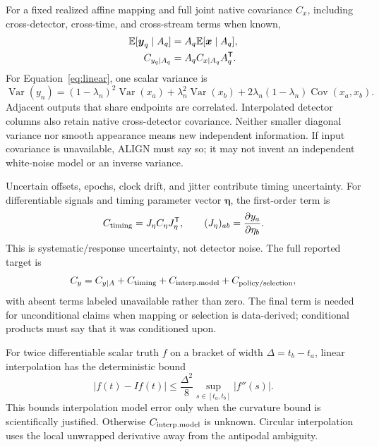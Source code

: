 \documentclass[11pt]{article}
\newcommand{\E}{\mathbb{E}}
\newcommand{\Cov}{\operatorname{Cov}}
\newcommand{\Var}{\operatorname{Var}}
\begin{document}
For a fixed realized affine mapping and full joint native covariance \(C_x\),
including cross-detector, cross-time, and cross-stream terms when known,
\begin{align}
 \E[\boldsymbol y_q\mid A_q]&=A_q\E[\boldsymbol x\mid A_q],\notag\\
 C_{y_q\mid A_q}&=A_qC_{x\mid A_q}A_q^{\mathsf T}.
 \label{eq:covariance}
\end{align}
For Equation~\eqref{eq:linear}, one scalar variance is
\begin{equation}
 \Var(y_n)=(1-\lambda_n)^2\Var(x_a)+\lambda_n^2\Var(x_b)
 +2\lambda_n(1-\lambda_n)\Cov(x_a,x_b).
 \label{eq:linear-variance}
\end{equation}
Adjacent outputs that share endpoints are correlated.  Interpolated detector
columns also retain native cross-detector covariance.  Neither smaller
diagonal variance nor smooth appearance means new independent information.
If input covariance is unavailable, ALIGN must say so; it may not invent an
independent white-noise model or an inverse variance.

Uncertain offsets, epochs, clock drift, and jitter contribute timing
uncertainty.  For differentiable signals and timing parameter vector
\(\boldsymbol\eta\), the first-order term is
\begin{equation}
 C_{\rm timing}=J_{\eta}C_{\eta}J_{\eta}^{\mathsf T},
 \qquad (J_{\eta})_{ab}=\frac{\partial y_a}{\partial\eta_b}.
 \label{eq:timing-covariance}
\end{equation}
This is systematic/response uncertainty, not detector noise.  The full
reported target is
\begin{equation}
 C_y=C_{y\mid A}+C_{\rm timing}+C_{\rm interp.model}
 +C_{\rm policy/selection},
 \label{eq:full-uncertainty}
\end{equation}
with absent terms labeled unavailable rather than zero.  The final term is
needed for unconditional claims when mapping or selection is data-derived;
conditional products must say that it was conditioned upon.

For twice differentiable scalar truth \(f\) on a bracket of width
\(\Delta=t_b-t_a\), linear interpolation has the deterministic bound
\begin{equation}
 |f(t)-I f(t)|\leq\frac{\Delta^2}{8}
 \sup_{s\in[t_a,t_b]}|f''(s)|.
 \label{eq:interp-bound}
\end{equation}
This bounds interpolation model error only when the curvature bound is
scientifically justified.  Otherwise \(C_{\rm interp.model}\) is unknown.
Circular interpolation uses the local unwrapped derivative away from the
antipodal ambiguity.
\end{document}
